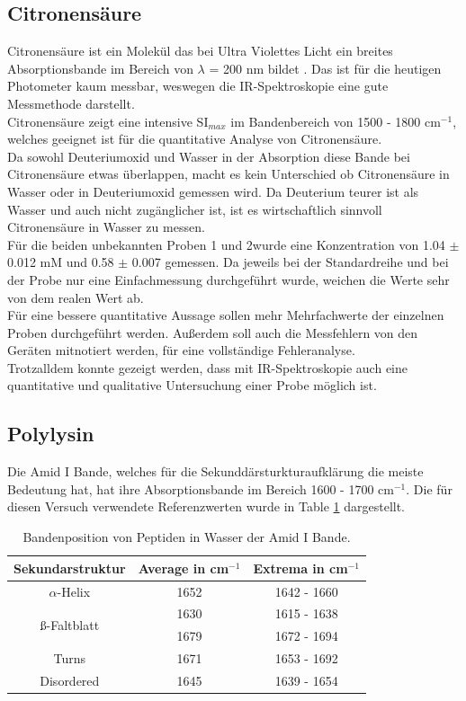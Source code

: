\documentclass[10pt,a4paper]{article}
\begin{document}
			\subsection{Citronensäure}
				Citronensäure ist ein Molekül das bei Ultra Violettes Licht ein breites Absorptionsbande im Bereich von $\lambda$ = 200 nm bildet \cite{Citricacid_UV}. Das ist für die heutigen Photometer kaum messbar, weswegen die IR-Spektroskopie eine gute Messmethode darstellt.\\
				Citronensäure zeigt eine intensive SI$_{max}$ im Bandenbereich von 1500 - 1800 cm$^{-1}$, welches geeignet ist für die quantitative Analyse von Citronensäure.\\
				Da sowohl Deuteriumoxid und Wasser in der Absorption diese Bande bei Citronensäure etwas überlappen, macht es kein Unterschied ob Citronensäure in Wasser oder in Deuteriumoxid gemessen wird. Da Deuterium teurer ist als Wasser und auch nicht zugänglicher ist, ist es wirtschaftlich sinnvoll Citronensäure in Wasser zu messen.\\
				Für die beiden unbekannten Proben 1 und 2wurde eine Konzentration von 1.04 $\pm$ 0.012 mM und 0.58 $\pm$ 0.007 gemessen.
				Da jeweils bei der Standardreihe und bei der Probe nur eine Einfachmessung durchgeführt wurde, weichen die Werte sehr von dem realen Wert ab.\\
				Für eine bessere quantitative Aussage sollen mehr Mehrfachwerte der einzelnen Proben durchgeführt werden. Außerdem soll auch die Messfehlern von den Geräten mitnotiert werden, für eine vollständige Fehleranalyse.\\
				Trotzalldem konnte gezeigt werden, dass mit IR-Spektroskopie auch eine quantitative und qualitative Untersuchung einer Probe möglich ist.
			
			
			\subsection{Polylysin}
				Die Amid I Bande, welches für die Sekunddärsturkturaufklärung die meiste Bedeutung hat, hat ihre Absorptionsbande im Bereich 1600 - 1700 cm$^{-1}$.
				Die für diesen Versuch verwendete Referenzwerten wurde in Table \ref{tab:ref_values_sec_stru} dargestellt.
					\begin{table}[H]
						\centering
						\caption{Bandenposition von Peptiden in Wasser der Amid I Bande\cite{Script}.}
						\label{tab:ref_values_sec_stru}
						\begin{tabular}{ccc}
							\toprule
							Sekundarstruktur & Average in  cm$^{-1}$& Extrema in cm$^{-1}$\\
							\midrule
							$\alpha$-Helix & 1652 & 1642 - 1660\\
							\midrule
							\multirow{2}{*}{ß-Faltblatt } & 1630 & 1615 - 1638\\
							& 1679 & 1672 - 1694\\
							\midrule
							Turns & 1671 & 1653 - 1692 \\
							\midrule
							Disordered & 1645 & 1639 - 1654\\
							\bottomrule
						\end{tabular}
					\end{table}				
						
\end{document}
